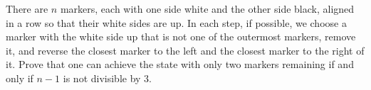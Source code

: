 There are $n$ markers, each with one side white and the other side black, aligned in a row so that their white sides are up. In each step, if possible, we choose a marker with the white side up that is not one of the outermost markers, remove it, and reverse the closest marker to the left and the closest marker to the right of it. Prove that one can achieve the state with only two markers remaining if and only if $n - 1$ is not divisible by $3$.
